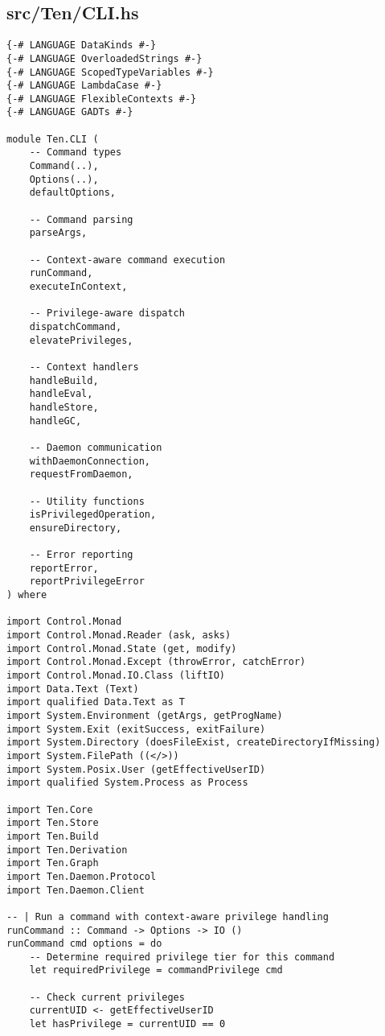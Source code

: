 \documentclass{article}
\begin{document}
\subsection{src/Ten/CLI.hs}

\begin{tcolorbox}[title=Ten/CLI.hs Changes]
\begin{verbatim}
{-# LANGUAGE DataKinds #-}
{-# LANGUAGE OverloadedStrings #-}
{-# LANGUAGE ScopedTypeVariables #-}
{-# LANGUAGE LambdaCase #-}
{-# LANGUAGE FlexibleContexts #-}
{-# LANGUAGE GADTs #-}

module Ten.CLI (
    -- Command types
    Command(..),
    Options(..),
    defaultOptions,

    -- Command parsing
    parseArgs,

    -- Context-aware command execution
    runCommand,
    executeInContext,

    -- Privilege-aware dispatch
    dispatchCommand,
    elevatePrivileges,

    -- Context handlers
    handleBuild,
    handleEval,
    handleStore,
    handleGC,

    -- Daemon communication
    withDaemonConnection,
    requestFromDaemon,

    -- Utility functions
    isPrivilegedOperation,
    ensureDirectory,

    -- Error reporting
    reportError,
    reportPrivilegeError
) where

import Control.Monad
import Control.Monad.Reader (ask, asks)
import Control.Monad.State (get, modify)
import Control.Monad.Except (throwError, catchError)
import Control.Monad.IO.Class (liftIO)
import Data.Text (Text)
import qualified Data.Text as T
import System.Environment (getArgs, getProgName)
import System.Exit (exitSuccess, exitFailure)
import System.Directory (doesFileExist, createDirectoryIfMissing)
import System.FilePath ((</>))
import System.Posix.User (getEffectiveUserID)
import qualified System.Process as Process

import Ten.Core
import Ten.Store
import Ten.Build
import Ten.Derivation
import Ten.Graph
import Ten.Daemon.Protocol
import Ten.Daemon.Client

-- | Run a command with context-aware privilege handling
runCommand :: Command -> Options -> IO ()
runCommand cmd options = do
    -- Determine required privilege tier for this command
    let requiredPrivilege = commandPrivilege cmd

    -- Check current privileges
    currentUID <- getEffectiveUserID
    let hasPrivilege = currentUID == 0


\end{verbatim}
\end{tcolorbox}
\end{document}
